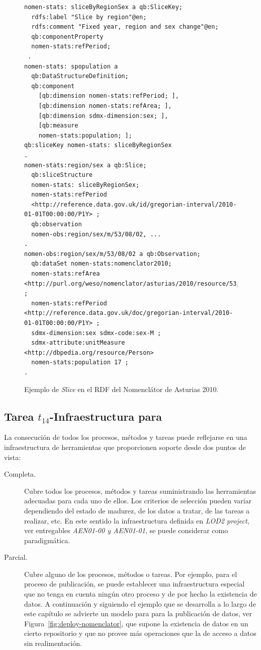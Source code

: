 \begin{figure}[!htp]
\begin{lstlisting}[basicstyle=\scriptsize] 
nomen-stats: sliceByRegionSex a qb:SliceKey;
  rdfs:label "Slice by region"@en;
  rdfs:comment "Fixed year, region and sex change"@en;
  qb:componentProperty
  nomen-stats:refPeriod; 
 .
nomen-stats: spopulation a
  qb:DataStructureDefinition;
  qb:component
    [qb:dimension nomen-stats:refPeriod; ],
    [qb:dimension nomen-stats:refArea; ],
    [qb:dimension sdmx-dimension:sex; ],
    [qb:measure
    nomen-stats:population; ];
qb:sliceKey nomen-stats: sliceByRegionSex
.
nomen-stats:region/sex a qb:Slice;
  qb:sliceStructure
  nomen-stats: sliceByRegionSex;
  nomen-stats:refPeriod
  <http://reference.data.gov.uk/id/gregorian-interval/2010-01-01T00:00:00/P1Y> ;
  qb:observation
  nomen-obs:region/sex/m/53/08/02, ...
.
nomen-obs:region/sex/m/53/08/02 a qb:Observation;
  qb:dataSet nomen-stats:nomenclator2010;
  nomen-stats:refArea <http://purl.org/weso/nomenclator/asturias/2010/resource/53/08/02> ;
  nomen-stats:refPeriod <http://reference.data.gov.uk/doc/gregorian-interval/2010-01-01T00:00:00/P1Y> ;
  sdmx-dimension:sex sdmx-code:sex-M ;
  sdmx-attribute:unitMeasure <http://dbpedia.org/resource/Person>
  nomen-stats:population 17 ; 
.
\end{lstlisting}
	\caption{Ejemplo de \textit{Slice} en el \dataset RDF del Nomenclátor de Asturias 2010.}
	\label{fig:slice-nomen}
\end{figure}

\newpage

\subsection{Tarea $t_{14}$-Infraestructura para \linkeddata}
La consecución de todos los procesos, métodos y tareas puede reflejarse en una infraestructura
de herramientas que proporcionen soporte desde dos puntos de vista:

\begin{description}
 \item [Completa.] Cubre todos los procesos, métodos y tareas suministrando las herramientas
adecuadas para cada uno de ellos. Los criterios de selección pueden variar dependiendo
del estado de madurez, de los datos a tratar, de las tareas a realizar, etc. En este sentido
la infraestructura definida en \textit{LOD2 project}, ver entregables \textit{AEN01-00 y AEN01-01}, se puede
considerar como paradigmática.
\item [Parcial.] Cubre alguno de los procesos, métodos o tareas. Por ejemplo, para el proceso
de publicación, se puede establecer una infraestructura especial que no tenga en cuenta ningún
otro proceso y de por hecho la existencia de datos. A continuación y siguiendo el ejemplo que se desarrolla a lo largo de este capítulo se advierte 
un modelo para para la publicación de datos, ver Figura~\ref{fig:deploy-nomenclator}, que 
supone la existencia de datos en un cierto repositorio y que no provee más operaciones
que la de acceso a datos sin realimentación.
\end{description}

